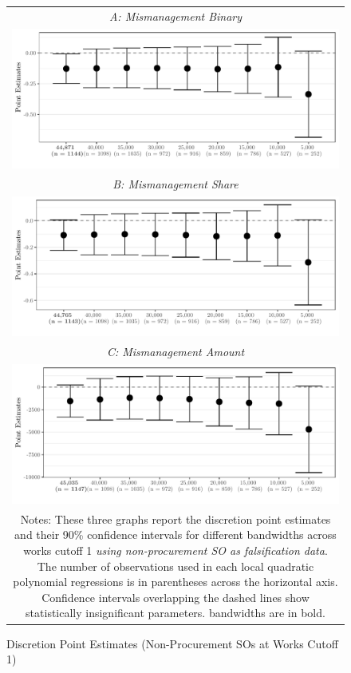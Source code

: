 \documentclass[11pt]{article}
\begin{document}
\begin{figure}[!htbp]
\caption{Discretion Point Estimates (Non-Procurement SOs at Works Cutoff 1)}
\label{fig:02falsification}
\centering
\small
\begin{tabular}{c}
\emph{A: Mismanagement Binary} \\
\includegraphics[scale = .70]{../plots/02falsificationplot1.pdf} \\
\emph{B: Mismanagement Share} \\
\includegraphics[scale = .70]{../plots/02falsificationplot2.pdf} \\
\emph{C: Mismanagement Amount} \\
\includegraphics[scale = .70]{../plots/02falsificationplot3.pdf} \\
\multicolumn{1}{p{.67\textwidth}}{\scriptsize Notes: These three graphs report the discretion point estimates and their 90\% confidence intervals for different bandwidths across works cutoff 1 \emph{using non-procurement SO as falsification data}. The number of observations used in each local quadratic polynomial regressions is in parentheses across the horizontal axis. Confidence intervals overlapping the dashed lines show statistically insignificant parameters. \citet{CalonicoOptimalDataDrivenRegression2015} bandwidths are in bold.}
\end{tabular}
\end{figure}
\end{document}
